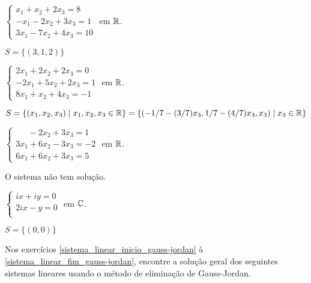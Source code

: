 \documentclass[12pt]{exam}
\begin{document}
\begin{exercicio}
  $
    \begin{cases}
      x_1 + x_2 + 2x_3 = 8\\
      -x_1 - 2x_2 + 3x_3 = 1\\
      3x_1 - 7x_2 + 4x_3 = 10
    \end{cases}
  $
  em $\mathbb{R}$.
  \begin{solucao}
    $S = \{(3, 1, 2)\}$
  \end{solucao}
\end{exercicio}

\begin{exercicio}
  $
    \begin{cases}
      2x_1 + 2x_2 + 2x_3 = 0\\
      -2x_1 + 5x_2 + 2x_3 = 1\\
      8x_1 + x_2 + 4x_3 = -1
    \end{cases}
  $
  em $\mathbb{R}$.
  \begin{solucao}
    $S = \{(x_1, x_2, x_3) \mid x_1, x_2, x_3 \in \mathbb{R}\} = \{(-1/7 - (3/7)x_3, 1/7 - (4/7)x_3, x_3) \mid x_3 \in \mathbb{R}\}$
  \end{solucao}
\end{exercicio}

\begin{exercicio}
  $
    \begin{cases}
      \phantom{2x_1} - 2x_2 + 3x_3 = 1\\
      3x_1 + 6x_2 - 3x_3 = -2\\
      6x_1 + 6x_2 + 3x_3 = 5
    \end{cases}
  $
  em $\mathbb{R}$.
  \begin{solucao}
    O sistema não tem solução.
  \end{solucao}
\end{exercicio}

\begin{exercicio}\label{sistema_linear_eliminacao}
  $
    \begin{cases}
      ix + iy = 0\\
      2ix - y = 0\\
    \end{cases}
  $
  em $\mathbb{C}$.
  \begin{solucao}
    $S = \{(0, 0)\}$
  \end{solucao}
\end{exercicio}

Nos exercícios \ref{sistema_linear_inicio_gauss-jordan} à \ref{sistema_linear_fim_gauss-jordan}, encontre a solução geral dos seguintes sistemas lineares usando o método de eliminação de Gauss-Jordan.
\end{document}
